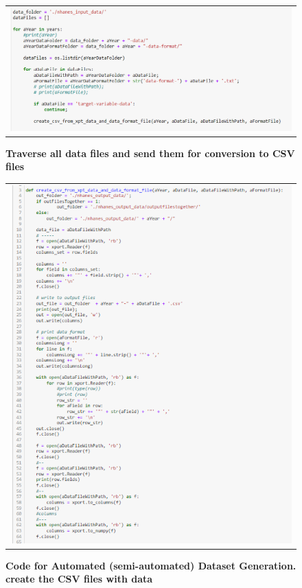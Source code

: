 \begin{figure}[!htb]
\begin{tabular}{c}
\includegraphics[scale=0.8]{images/datasetgenerationcode/convert-all-input-datafiles-for-multiple-years-into-csv-files.png} \\
\end{tabular}
\caption{\textbf{Traverse all data files and send them for conversion to CSV files}}
\label{automated-data-traverse}
\vspace{0.25cm}
\end{figure}


\begin{figure}[!htb]
\begin{tabular}{c}
\includegraphics[scale=1]{images/datasetgenerationcode/code-writing-data-one-file-at-a-time.png} \\
\end{tabular}
\caption{\textbf{Code for Automated (semi-automated) Dataset Generation. create the CSV files with data}}
\label{automated-data-csv}
\vspace{0.25cm}
\end{figure}

